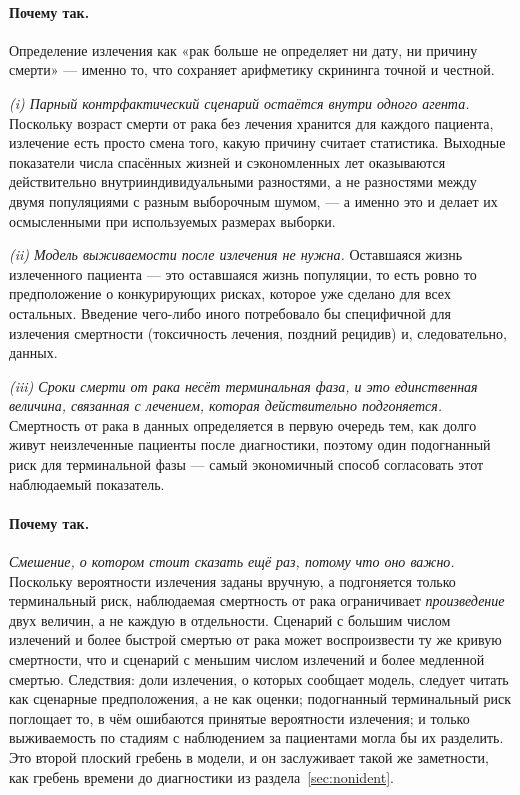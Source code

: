 \documentclass[12pt,a4paper]{article}
\newcommand{\why}[1]{\paragraph{Почему так.} #1}
\begin{document}
\why{Определение излечения как «рак больше не определяет ни дату, ни причину смерти» --- именно то, что
сохраняет арифметику скрининга точной и честной.

\emph{(i) Парный контрфактический сценарий остаётся внутри одного агента.} Поскольку возраст смерти от рака
без лечения хранится для каждого пациента, излечение есть просто смена того, какую причину считает
статистика. Выходные показатели числа спасённых жизней и сэкономленных лет оказываются действительно
внутрииндивидуальными разностями, а не разностями между двумя популяциями с разным выборочным шумом, --- а
именно это и делает их осмысленными при используемых размерах выборки.

\emph{(ii) Модель выживаемости после излечения не нужна.} Оставшаяся жизнь излеченного пациента --- это
оставшаяся жизнь популяции, то есть ровно то предположение о конкурирующих рисках, которое уже сделано для
всех остальных. Введение чего-либо иного потребовало бы специфичной для излечения смертности (токсичность
лечения, поздний рецидив) и, следовательно, данных.

\emph{(iii) Сроки смерти от рака несёт терминальная фаза, и это единственная величина, связанная с лечением,
которая действительно подгоняется.} Смертность от рака в данных определяется в первую очередь тем, как
долго живут неизлеченные пациенты после диагностики, поэтому один подогнанный риск для терминальной фазы
--- самый экономичный способ согласовать этот наблюдаемый показатель.}

\why{\emph{Смешение, о котором стоит сказать ещё раз, потому что оно важно.} Поскольку вероятности излечения
заданы вручную, а подгоняется только терминальный риск, наблюдаемая смертность от рака ограничивает
\emph{произведение} двух величин, а не каждую в отдельности. Сценарий с большим числом излечений и более
быстрой смертью от рака может воспроизвести ту же кривую смертности, что и сценарий с меньшим числом
излечений и более медленной смертью. Следствия: доли излечения, о которых сообщает модель, следует читать
как сценарные предположения, а не как оценки; подогнанный терминальный риск поглощает то, в чём ошибаются
принятые вероятности излечения; и только выживаемость по стадиям с наблюдением за пациентами могла бы их
разделить. Это второй плоский гребень в модели, и он заслуживает такой же заметности, как гребень времени до
диагностики из раздела~\ref{sec:nonident}.}
\end{document}
